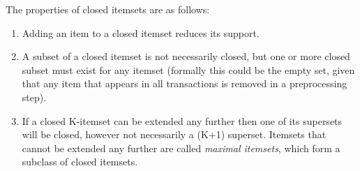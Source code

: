 \documentclass{sig-alternate}
\begin{document}
The properties of closed itemsets are as follows:
\begin{enumerate}
\item Adding an item to a closed itemset reduces its support. 
\item A subset of a closed itemset is not necessarily closed, but one or more closed subset must exist for any itemset (formally this could be the empty set, given that any item that appears in all transactions is removed in a preprocessing step). 
\item If a closed K-itemset can be extended any further then one of its supersets will be closed, however not necessarily a (K+1) superset. Itemsets that cannot be extended any further are called \emph{maximal itemsets}, which form a subclass of closed itemsets.
\end{enumerate}
\end{document}
